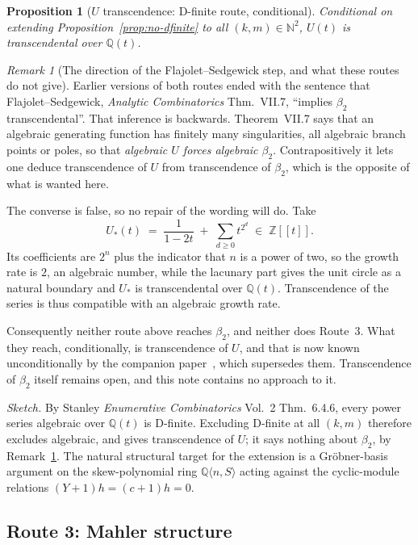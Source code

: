 \documentclass[11pt,a4paper]{article}
\newtheorem{proposition}{Proposition}
\theoremstyle{remark}
\newtheorem{remark}{Remark}
\theoremstyle{plain}
\begin{document}
\begin{proposition}[$U$ transcendence: D-finite route, conditional]
\label{prop:beta2-dfinite}
Conditional on extending Proposition~\ref{prop:no-dfinite} to all
$(k, m) \in \mathbb{N}^2$, $U(t)$ is transcendental over $\mathbb{Q}(t)$.
\end{proposition}

\begin{remark}[The direction of the Flajolet--Sedgewick step, and what these routes do not give]
\label{rem:fs-direction}
Earlier versions of both routes ended with the sentence that
Flajolet--Sedgewick, \emph{Analytic Combinatorics} Thm.~VII.7, ``implies
$\beta_2$ transcendental''.  That inference is backwards. Theorem~VII.7
says that an algebraic generating function has finitely many
singularities, all algebraic branch points or poles, so that
\emph{algebraic $U$ forces algebraic $\beta_2$}.  Contrapositively it
lets one deduce transcendence of $U$ from transcendence of $\beta_2$,
which is the opposite of what is wanted here.

The converse is false, so no repair of the wording will do. Take
\[
   U_\ast(t) \;=\; \frac{1}{1-2t} \;+\; \sum_{d \ge 0} t^{2^d}
   \;\in\; \mathbb{Z}[[t]] .
\]
Its coefficients are $2^n$ plus the indicator that $n$ is a power of
two, so the growth rate is $2$, an algebraic number, while the lacunary
part gives the unit circle as a natural boundary and $U_\ast$ is
transcendental over $\mathbb{Q}(t)$. Transcendence of the series is thus
compatible with an algebraic growth rate.

Consequently neither route above reaches $\beta_2$, and neither does
Route~3. What they reach, conditionally, is transcendence of $U$, and
that is now known unconditionally by the companion
paper~\cite{Bonfioli2}, which supersedes them. Transcendence of
$\beta_2$ itself remains open, and this note contains no approach to it.
\end{remark}

\emph{Sketch.}  By Stanley \emph{Enumerative Combinatorics} Vol.~2
Thm.~6.4.6, every power series algebraic over $\mathbb{Q}(t)$ is
D-finite.  Excluding D-finite at all $(k, m)$ therefore excludes
algebraic, and gives transcendence of $U$; it says nothing about
$\beta_2$, by Remark~\ref{rem:fs-direction}.  The natural
structural target for the extension is a Gr\"obner-basis argument on
the skew-polynomial ring $\mathbb{Q}\langle n, S\rangle$ acting against
the cyclic-module relations $(Y+1)h = (c+1)h = 0$.

\subsection{Route 3: Mahler structure}
\label{ssec:mahler-route}
\end{document}
